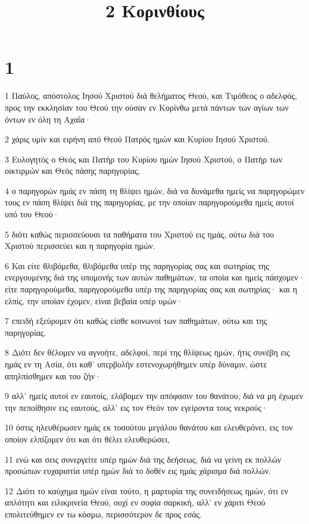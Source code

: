 

\title{2 Κορινθίους}


\chapter{1}

\par 1 Παύλος, απόστολος Ιησού Χριστού διά θελήματος Θεού, και Τιμόθεος ο αδελφός, προς την εκκλησίαν του Θεού την ούσαν εν Κορίνθω μετά πάντων των αγίων των όντων εν όλη τη Αχαΐα·
\par 2 χάρις υμίν και ειρήνη από Θεού Πατρός ημών και Κυρίου Ιησού Χριστού.
\par 3 Ευλογητός ο Θεός και Πατήρ του Κυρίου ημών Ιησού Χριστού, ο Πατήρ των οικτιρμών και Θεός πάσης παρηγορίας,
\par 4 ο παρηγορών ημάς εν πάση τη θλίψει ημών, διά να δυνάμεθα ημείς να παρηγορώμεν τους εν πάση θλίψει διά της παρηγορίας, με την οποίαν παρηγορούμεθα ημείς αυτοί υπό του Θεού·
\par 5 διότι καθώς περισσεύουσι τα παθήματα του Χριστού εις ημάς, ούτω διά του Χριστού περισσεύει και η παρηγορία ημών.
\par 6 Και είτε θλιβόμεθα, θλιβόμεθα υπέρ της παρηγορίας σας και σωτηρίας της ενεργουμένης διά της υπομονής των αυτών παθημάτων, τα οποία και ημείς πάσχομεν· είτε παρηγορούμεθα, παρηγορούμεθα υπέρ της παρηγορίας σας και σωτηρίας· και η ελπίς, την οποίαν έχομεν, είναι βεβαία υπέρ υμών·
\par 7 επειδή εξεύρομεν ότι καθώς είσθε κοινωνοί των παθημάτων, ούτω και της παρηγορίας.
\par 8 Διότι δεν θέλομεν να αγνοήτε, αδελφοί, περί της θλίψεως ημών, ήτις συνέβη εις ημάς εν τη Ασία, ότι καθ' υπερβολήν εστενοχωρήθημεν υπέρ δύναμιν, ώστε απηλπίσθημεν και του ζήν·
\par 9 αλλ' ημείς αυτοί εν εαυτοίς, ελάβομεν την απόφασιν του θανάτου, διά να μη έχωμεν την πεποίθησιν εις εαυτούς, αλλ' εις τον Θεόν τον εγείροντα τους νεκρούς·
\par 10 όστις ηλευθέρωσεν ημάς εκ τοσούτου μεγάλου θανάτου και ελευθερόνει, εις τον οποίον ελπίζομεν ότι και ότι θέλει ελευθερώσει,
\par 11 ενώ και σεις συνεργείτε υπέρ ημών διά της δεήσεως, διά να γείνη εκ πολλών προσώπων ευχαριστία υπέρ ημών διά το δοθέν εις ημάς χάρισμα διά πολλών.
\par 12 Διότι το καύχημα ημών είναι τούτο, η μαρτυρία της συνειδήσεως ημών, ότι εν απλότητι και ειλικρινεία Θεού, ουχί εν σοφία σαρκική, αλλ' εν χάριτι Θεού επολιτεύθημεν εν τω κόσμω, περισσότερον δε προς εσάς.
